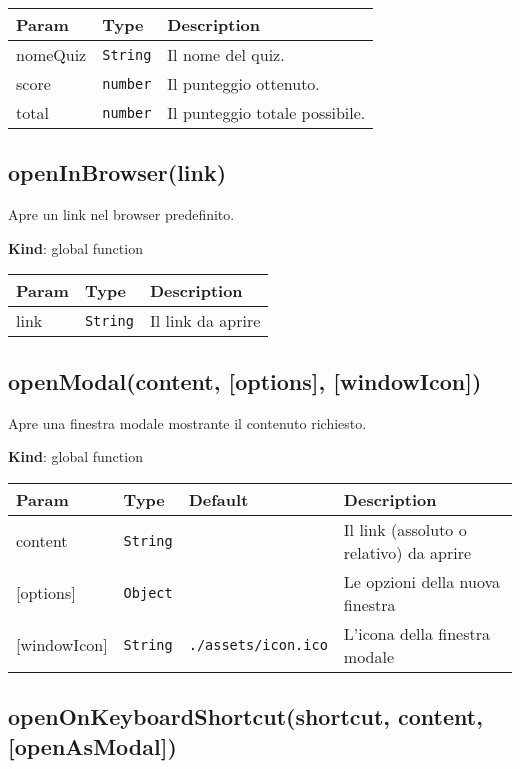\begin{tabularx}{\textwidth}{XXX}
\toprule
Param & Type & Description\tabularnewline
\midrule
\endhead
nomeQuiz & \texttt{String} & Il nome del quiz.\tabularnewline
score & \texttt{number} & Il punteggio ottenuto.\tabularnewline
total & \texttt{number} & Il punteggio totale possibile.\tabularnewline
\bottomrule
\end{tabularx}

\protect\hypertarget{openInBrowser}{}{}

\hypertarget{openinbrowserlink}{%
\subsection{openInBrowser(link)}\label{openinbrowserlink}}

Apre un link nel browser predefinito.

\textbf{Kind}: global function

\begin{tabularx}{\textwidth}{XXX}
\toprule
Param & Type & Description\tabularnewline
\midrule
\endhead
link & \texttt{String} & Il link da aprire\tabularnewline
\bottomrule
\end{tabularx}

\protect\hypertarget{openModal}{}{}

\hypertarget{openmodalcontent-options-windowicon}{%
\subsection{openModal(content, {[}options{]},
{[}windowIcon{]})}\label{openmodalcontent-options-windowicon}}

Apre una finestra modale mostrante il contenuto richiesto.

\textbf{Kind}: global function

\begin{tabularx}{\textwidth}{XXXX}
\toprule
Param & Type & Default & Description\tabularnewline
\midrule
\endhead
content & \texttt{String} & & Il link (assoluto o relativo) da
aprire\tabularnewline
{[}options{]} & \texttt{Object} & & Le opzioni della nuova
finestra\tabularnewline
{[}windowIcon{]} & \texttt{String} & \texttt{./assets/icon.ico} &
L'icona della finestra modale\tabularnewline
\bottomrule
\end{tabularx}

\protect\hypertarget{openOnKeyboardShortcut}{}{}

\hypertarget{openonkeyboardshortcutshortcut-content-openasmodal}{%
\subsection{openOnKeyboardShortcut(shortcut, content,
{[}openAsModal{]})}\label{openonkeyboardshortcutshortcut-content-openasmodal}}

